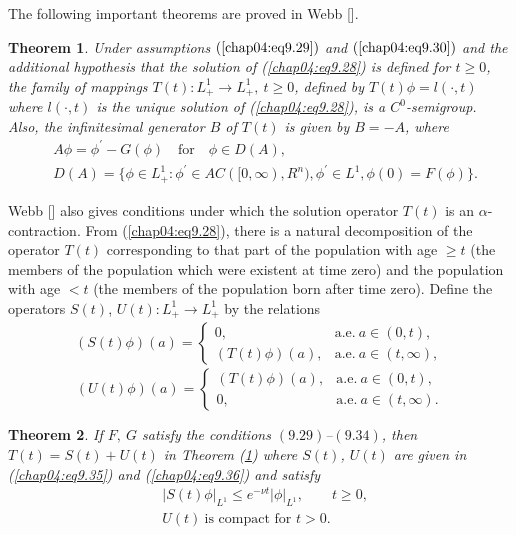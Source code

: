\documentclass{surv-l}
\theoremstyle{plain}
\newtheorem{theorem}{Theorem}[section]
\theoremstyle{definition}
\numberwithin{equation}{section}
\numberwithin{figure}{chapter}
\begin{document}
The following important theorems are proved in Webb [\citeyear{1985w}].

\begin{theorem}\label{thm4.9.8} Under assumptions $(\ref{chap04:eq9.29})$ and $(\ref{chap04:eq9.30})$ and the additional hypothesis that the solution of \emph{(\ref{chap04:eq9.28})} is defined for $t\geq 0$, the family of mappings $T(t):L_{+}^{1}\rightarrow L_{+}^{1},\ t\geq 0$, defined by $T(t)\phi=l(\cdot, t)$ where $l(\cdot, t)$ is the unique solution of \emph{(\ref{chap04:eq9.28})}, is a $C^{0}$-semigroup. Also, the infinitesimal generator $B$ of $T(t)$ is given by $B=-A$, where
\begin{align*}
& A\phi=\phi^{\prime}-G(\phi)\quad \text{for}\quad \phi \in D(A),\\
& D(A)=\{\phi\in L_{+}^{1}:\phi^{\prime}\in AC([0, \infty), R^{n}), \phi^{\prime}\in L^{1}, \phi(0)=F(\phi)\}.
\end{align*}
\end{theorem}

Webb [\citeyear{1985w}] also gives conditions under which the solution operator $T(t)$ is an $\alpha$-contraction. From (\ref{chap04:eq9.28}), there is a natural decomposition of the operator $T(t)$ corresponding to that part of the population with age $\geq t$ (the members of the population which were existent at time zero) and the population with age $<t$ (the members of the population born after time zero). Define the operators $S(t)$, $U(t): L_{+}^{1}\rightarrow L_{+}^{1}$ by the relations
\setcounter{equation}{34}
\begin{align}\label{chap04:eq9.35}
(S(t)\phi)(a)=\left\{\begin{array}{ll}
0, & \mathrm{a.e.}\ a\in(0, t),\\
(T(t)\phi)(a), & \mathrm{a.e.}\ a\in(t, \infty),
\end{array}\right.
\end{align}
\begin{equation}\label{chap04:eq9.36}
(U(t)\phi)(a)=\left\{\begin{array}{ll}
(T(t)\phi)(a), & \mathrm{a.e.}\ a\in(0, t),\\
0, & \mathrm{a.e.}\ a\in(t, \infty).
\end{array}\right.
\end{equation}

\begin{theorem}\label{thm4.9.9} If $F,\ G$ satisfy the conditions $(9.29)$--$(9.34)$, then $T(t)=S(t)+U(t)$ in Theorem \emph{(\ref{thm4.9.8})} where $S(t)$, $U(t)$ are given in \emph{(\ref{chap04:eq9.35})} and \emph{(\ref{chap04:eq9.36})} and satisfy
\begin{equation}\label{chap04:eq9.37}
\begin{split}
& |S(t)\phi|_{L^{1}}\leq e^{-\nu t}|\phi|_{L^{1}},\qquad t\geq 0,\\
& U(t)\ \text{is compact for } t>0.
\end{split}
\end{equation}
\end{theorem}
\end{document}
